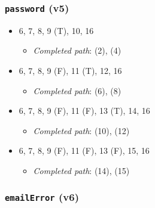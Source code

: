 \documentclass{article}
\newcommand{\completedpath}{\textit{Completed path}}
\begin{document}
\subsubsection*{\texttt{password} (v5)}

\begin{itemize}
    \item 6, 7, 8, 9 (T), 10, 16
          \begin{itemize}
              \item \completedpath: (2), (4)
          \end{itemize}
    \item 6, 7, 8, 9 (F), 11 (T), 12, 16
          \begin{itemize}
              \item \completedpath: (6), (8)
          \end{itemize}
    \item 6, 7, 8, 9 (F), 11 (F), 13 (T), 14, 16
          \begin{itemize}
              \item \completedpath: (10), (12)
          \end{itemize}
    \item 6, 7, 8, 9 (F), 11 (F), 13 (F), 15, 16
          \begin{itemize}
              \item \completedpath: (14), (15)
          \end{itemize}
\end{itemize}

\subsubsection*{\texttt{emailError} (v6)}
\end{document}

